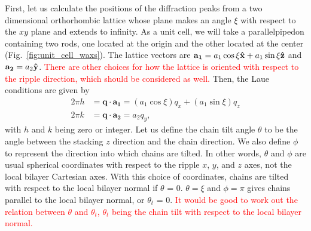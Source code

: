 First, let us calculate the positions of the diffraction peaks from a two 
dimensional orthorhombic lattice whose plane makes an angle $\xi$ with 
respect to the $xy$ plane and extends to infinity. 
As a unit cell, we will take a parallelpipedon containing two rods,
one located at the origin and the other located at the center
(Fig.~\ref{fig:unit_cell_waxs}).
The lattice vectors are $\mathbf{a_1}=a_1\cos\xi\mathbf{\hat{x}}+a_1\sin\xi\mathbf{\hat{z}}$ 
and $\mathbf{a_2}=a_2\mathbf{\hat{y}}$. \textcolor{red}{There are other choices for
how the lattice is oriented with respect to the ripple direction,
which should be considered as well.}
Then, the Laue conditions are given by
\begin{align}
	2\pi h &=\mathbf{q}\cdot\mathbf{a_1}=(a_1\cos\xi)q_x+(a_1\sin\xi)q_z \\
	2\pi k &=\mathbf{q}\cdot\mathbf{a_2}=a_2 q_y,
\end{align}
with $h$ and $k$ being zero or integer. 
Let us define the chain tilt angle $\theta$ to be the angle between
the stacking $z$ direction and the chain direction. We also define
$\phi$ to represent the direction into which chains are tilted.
In other words, $\theta$ and $\phi$ are usual spherical coordinates
with respect to the ripple $x$, $y$, and $z$ axes, not the local
bilayer Cartesian axes. With this choice of coordinates, chains 
are tilted with respect to the local bilayer normal if 
$\theta$ = 0. $\theta=\xi$ and $\phi=\pi$ gives chains parallel to the
local bilayer normal, or $\theta_t$ = 0. 
\textcolor{red}{It would be good to work out
the relation between $\theta$ and $\theta_t$, $\theta_t$ being the chain tilt
with respect to the local bilayer normal.}

